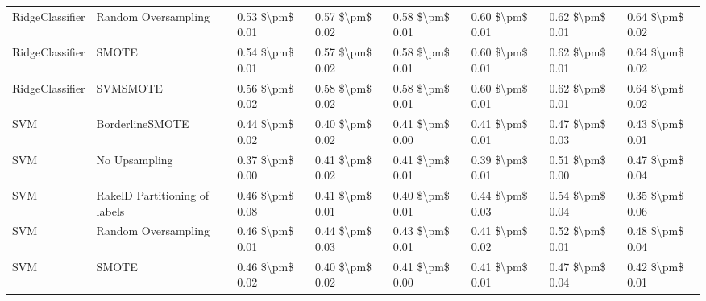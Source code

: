\begin{tabular}{llllllll}
                RidgeClassifier &           Random Oversampling &     0.53 \$\textbackslash pm\$ 0.01 &           0.57 \$\textbackslash pm\$ 0.02 &       0.58 \$\textbackslash pm\$ 0.01 &        0.60 \$\textbackslash pm\$ 0.01 &                         0.62 \$\textbackslash pm\$ 0.01 &     0.64 \$\textbackslash pm\$ 0.02 \\
                RidgeClassifier &                         SMOTE &     0.54 \$\textbackslash pm\$ 0.01 &           0.57 \$\textbackslash pm\$ 0.02 &       0.58 \$\textbackslash pm\$ 0.01 &        0.60 \$\textbackslash pm\$ 0.01 &                         0.62 \$\textbackslash pm\$ 0.01 &     0.64 \$\textbackslash pm\$ 0.02 \\
                RidgeClassifier &                      SVMSMOTE &     0.56 \$\textbackslash pm\$ 0.02 &           0.58 \$\textbackslash pm\$ 0.02 &       0.58 \$\textbackslash pm\$ 0.01 &        0.60 \$\textbackslash pm\$ 0.01 &                         0.62 \$\textbackslash pm\$ 0.01 &     0.64 \$\textbackslash pm\$ 0.02 \\
                            SVM &               BorderlineSMOTE &     0.44 \$\textbackslash pm\$ 0.02 &           0.40 \$\textbackslash pm\$ 0.02 &       0.41 \$\textbackslash pm\$ 0.00 &        0.41 \$\textbackslash pm\$ 0.01 &                         0.47 \$\textbackslash pm\$ 0.03 &     0.43 \$\textbackslash pm\$ 0.01 \\
                            SVM &                 No Upsampling &     0.37 \$\textbackslash pm\$ 0.00 &           0.41 \$\textbackslash pm\$ 0.02 &       0.41 \$\textbackslash pm\$ 0.01 &        0.39 \$\textbackslash pm\$ 0.01 &                         0.51 \$\textbackslash pm\$ 0.00 &     0.47 \$\textbackslash pm\$ 0.04 \\
                            SVM & RakelD Partitioning of labels &     0.46 \$\textbackslash pm\$ 0.08 &           0.41 \$\textbackslash pm\$ 0.01 &       0.40 \$\textbackslash pm\$ 0.01 &        0.44 \$\textbackslash pm\$ 0.03 &                         0.54 \$\textbackslash pm\$ 0.04 &     0.35 \$\textbackslash pm\$ 0.06 \\
                            SVM &           Random Oversampling &     0.46 \$\textbackslash pm\$ 0.01 &           0.44 \$\textbackslash pm\$ 0.03 &       0.43 \$\textbackslash pm\$ 0.01 &        0.41 \$\textbackslash pm\$ 0.02 &                         0.52 \$\textbackslash pm\$ 0.01 &     0.48 \$\textbackslash pm\$ 0.04 \\
                            SVM &                         SMOTE &     0.46 \$\textbackslash pm\$ 0.02 &           0.40 \$\textbackslash pm\$ 0.02 &       0.41 \$\textbackslash pm\$ 0.00 &        0.41 \$\textbackslash pm\$ 0.01 &                         0.47 \$\textbackslash pm\$ 0.04 &     0.42 \$\textbackslash pm\$ 0.01 \\

\end{tabular}
